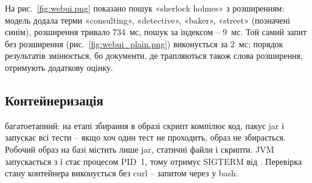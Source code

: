 На рис.~\ref{fig:webui.png} показано пошук «sherlock holmes» з розширенням: модель додала
терми «consulting», «detective», «baker», «street» (позначені синім), розширення тривало
734~мс, пошук за індексом -- 9~мс. Той самий запит без розширення (рис.~\ref{fig:webui_plain.png})
виконується за 2~мс; порядок результатів змінюється, бо документи, де трапляються також
слова розширення, отримують додаткову оцінку.


\subsection{Контейнеризація}

 багатоетапний: на етапі збирання в образі 
скрипт  компілює код, пакує jar і запускає всі тести -- якщо хоч один тест не
проходить, образ не збирається. Робочий образ на базі  містить
лише jar, статичні файли і скрипти. JVM запускається з
 і стає процесом PID~1, тому отримує SIGTERM від
. Перевірка стану контейнера виконується без curl -- запитом через
 у bash.
